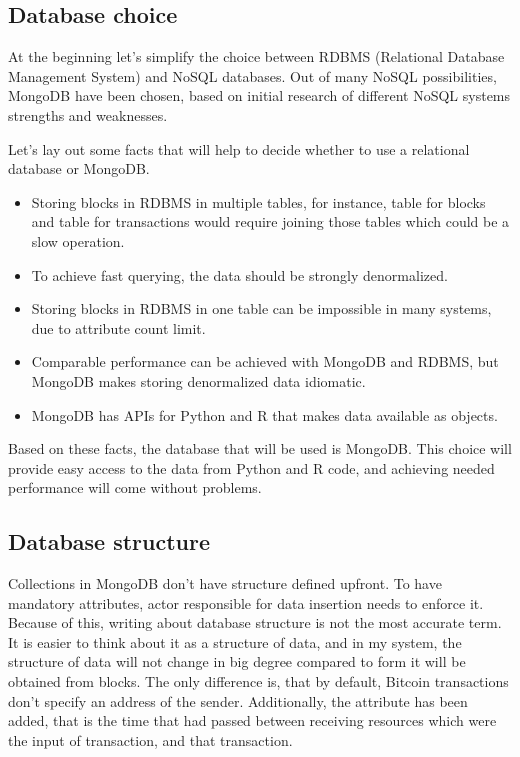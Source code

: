\documentclass[12pt, en, eng, twoside, final]{mgr}
\begin{document}
\subsection{Database choice}
At the beginning let's simplify the choice between RDBMS (Relational Database Management System) and NoSQL databases. Out of many NoSQL possibilities, MongoDB \cite{mongo} have been chosen, based on initial research of different NoSQL systems strengths and weaknesses.


Let's lay out some facts that will help to decide whether to use a relational database or MongoDB.

\begin{itemize}
\item 
Storing blocks in RDBMS in multiple tables, for instance, table for blocks and table for transactions would require joining those tables which could be a slow operation.
\item 
To achieve fast querying, the data should be strongly denormalized.
\item
Storing blocks in RDBMS in one table can be impossible in many systems, due to attribute count limit.
\item 
Comparable performance can be achieved with MongoDB and RDBMS, but MongoDB makes storing denormalized data idiomatic.
\item
MongoDB has APIs for Python and R that makes data available as objects.
\end{itemize}

Based on these facts, the database that will be used is MongoDB. This choice will provide easy access to the data from Python and R code, and achieving needed performance will come without problems.


\subsection{Database structure}
 
Collections in MongoDB don't have structure defined upfront. To have mandatory attributes, actor responsible for data insertion needs to enforce it. Because of this, writing about database structure is not the most accurate term. It is easier to think about it as a structure of data, and in my system, the structure of data will not change in big degree compared to form it will be obtained from blocks. The only difference is, that by default, Bitcoin transactions don't specify an address of the sender. Additionally, the attribute has been added, that is the time that had passed between receiving resources which were the input of transaction, and that transaction.
\end{document}
